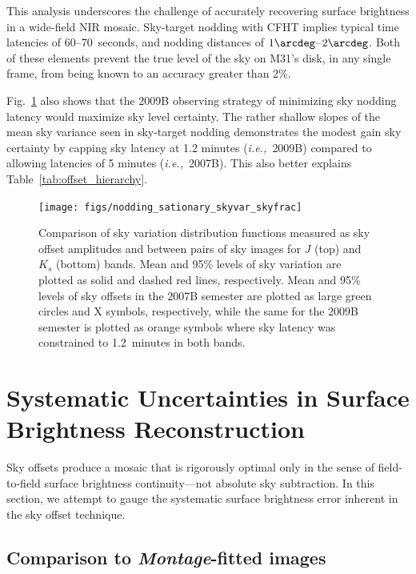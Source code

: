 \documentclass[iop]{emulateapj}
\newcommand{\ie}{\textit{i.e.,~}}
\newcommand{\sw}[1]{\textit{#1}} %
\newcommand{\mycomment}[1]{\textcolor{OliveGreen}{\textit{#1}}} %
\newcommand{\Fig}[1]{Fig.~\ref{fig:#1}}  %
\newcommand{\Tab}[1]{Table~\ref{tab:#1}}  %
\begin{document}

This analysis underscores the challenge of accurately recovering surface brightness in a wide-field NIR mosaic.
Sky-target nodding with CFHT implies typical time latencies of 60--70~seconds, and nodding distances of $1\arcdeg$--$2\arcdeg$.
Both of these elements prevent the true level of the sky on M31's disk, in any single frame, from being known to an accuracy greater than 2\%.

\Fig{nodding_stationary_skyvar_skyfrac} also shows that the 2009B observing strategy of minimizing sky nodding latency would maximize sky level certainty.
The rather shallow slopes of the mean sky variance seen in sky-target nodding demonstrates the modest gain sky certainty by capping sky latency at 1.2 minutes (\ie 2009B) compared to allowing latencies of 5 minutes (\ie 2007B).
This also better explains \Tab{offset_hierarchy}.

\begin{figure}[t]
\centering
\texttt{[image: figs/nodding\_sationary\_skyvar\_skyfrac]}
\caption{Comparison of sky variation distribution functions measured as sky offset amplitudes and between pairs of sky images for $J$ (top) and $K_s$ (bottom) bands.
Mean and 95\% levels of sky variation are plotted as solid and dashed red lines, respectively.
Mean and 95\% levels of sky offsets in the 2007B semester are plotted as large green circles and X symbols, respectively, while the same for the 2009B semester is plotted as orange symbols where sky latency was constrained to 1.2~minutes in both bands.}
\label{fig:nodding_stationary_skyvar_skyfrac}
\end{figure}


\section{Systematic Uncertainties in Surface Brightness Reconstruction}
\label{sec:systematics}

Sky offsets produce a mosaic that is rigorously optimal only in the sense of field-to-field surface brightness continuity---not absolute sky subtraction. In this section, we attempt to gauge the systematic surface brightness error inherent in the sky offset technique.


\subsection{Comparison to \sw{Montage}-fitted images}
\end{document}

